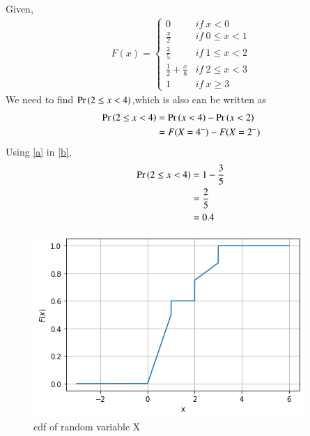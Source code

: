 
Given,
\begin{align}
F(x)= \begin{cases} 
       0  & if \:x<0\\
       \frac{x}{2} & if\: 0 \le x <1\\
       \frac{3}{5} & if \:1 \le x <2\\
       \frac{1}{2} +\frac{x}{8} & if\: 2\le x <3\\
       1  & if\: x\ge 3
    \end{cases} \label{a}
\end{align}
We need to find $\Pr\left(2\le x <4\right)$,which is also can be written as
\begin{align}
\pr{2\le x <4} &= \pr{x<4} - \pr{ x <2}\\
              &= F(X=4^{-}) - F(X=2^{-})\label{b}
 \end{align} 
 Using \eqref{a} in \eqref{b},
 \begin{align}
 \Pr\left(2\le x <4\right) &= 1 - \frac{3}{5}\\
                &= \frac{2}{5}\\
                &= 0.4 
\end{align} 


\begin{figure}[ht]
    \centering
    \includegraphics[width=\columnwidth]{solutions/adv/ma/2015/9/Fig_assign_5.png}
    \caption{cdf of random variable X}
\end{figure}
